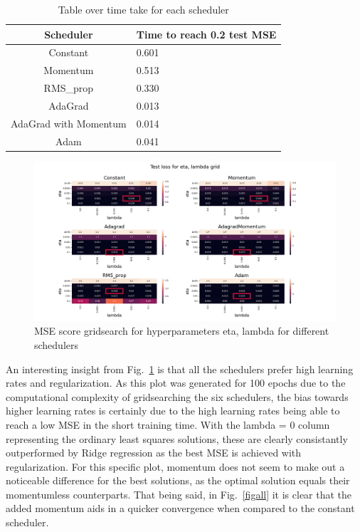 \documentclass[onecolumn,10pt,cleanfoot]{asme2ej}
\begin{document}
\begin{table}[h]
\caption{Table over time take for each scheduler}
\begin{center}
\label{timetable}
\begin{tabular}{| c | l |}
\hline
Scheduler & Time to reach 0.2 test MSE \\
\hline
Constant & 0.601 \\
Momentum & 0.513 \\
RMS\_prop & 0.330 \\
AdaGrad & 0.013 \\
AdaGrad with Momentum & 0.014 \\
Adam & 0.041 \\
\hline
\end{tabular}
\end{center}
\end{table}

\begin{figure}[h]
\centerline{\includegraphics[width=5in]{figure/100e_gridsearch.png}}
\caption{MSE score gridsearch for hyperparameters eta, lambda for different schedulers}
\label{heatmap}
\end{figure}

An interesting insight from Fig.~\ref{heatmap} is that all the schedulers prefer high learning rates and regularization. As this plot was generated for 100 epochs due to the computational complexity of gridsearching the six schedulers, the bias towards higher learning rates is certainly due to the high learning rates being able to reach a low MSE in the short training time. With the lambda = 0 column representing the ordinary least squares solutions, these are clearly consistantly outperformed by Ridge regression as the best MSE is achieved with regularization. For this specific plot, momentum does not seem to make out a noticeable difference for the best solutions, as the optimal solution equals their momentumless counterparts. That being said, in Fig.~\ref{figall} it is clear that the added momentum aids in a quicker convergence when compared to the constant scheduler.
\end{document}
